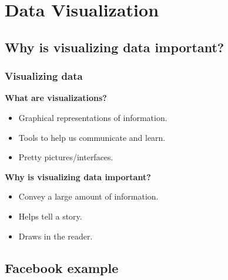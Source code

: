 \documentclass{beamer} %
\newcommand{\1}{\mathbb{1}}
\begin{document}


\section[Data Visualization]{Data Visualization}

\subsection[Why is visualizing data important?]{Why is visualizing data important?}

\begin{frame}[t]\frametitle{Visualizing data}
\begin{center}
{\bf{What are visualizations?}}
\vspace{2 mm}
\begin{itemize}
	\item Graphical representations of information.
	\item Tools to help us communicate and learn.
	\item Pretty pictures/interfaces.
\end{itemize}
\end{center}
\vspace{5 mm}

\begin{center}
{\bf{Why is visualizing data important?}}
\vspace{2 mm}

\begin{itemize}
	\item Convey a large amount of information.
	\item Helps tell a story.
	\item Draws in the reader.
\end{itemize}
\end{center}

\end{frame}


\subsection[Visualizing data - Facebook]{Facebook example}
\end{document}
